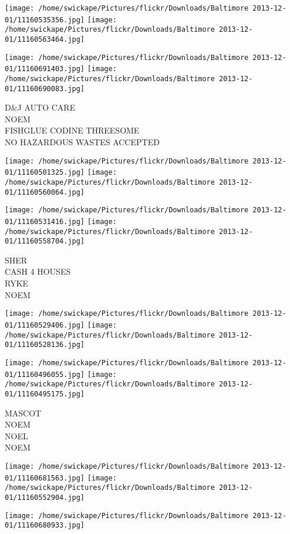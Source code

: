 \documentclass[10pt,letterpaper]{article}
\begin{document}
\texttt{[image: /home/swickape/Pictures/flickr/Downloads/Baltimore 2013-12-01/11160535356.jpg]}
\texttt{[image: /home/swickape/Pictures/flickr/Downloads/Baltimore 2013-12-01/11160563464.jpg]}

\texttt{[image: /home/swickape/Pictures/flickr/Downloads/Baltimore 2013-12-01/11160691403.jpg]}
\texttt{[image: /home/swickape/Pictures/flickr/Downloads/Baltimore 2013-12-01/11160690083.jpg]}

D\&J AUTO CARE\\
NOEM\\
FISHGLUE CODINE THREESOME\\
NO HAZARDOUS WASTES ACCEPTED
\pagebreak

\texttt{[image: /home/swickape/Pictures/flickr/Downloads/Baltimore 2013-12-01/11160501325.jpg]}
\texttt{[image: /home/swickape/Pictures/flickr/Downloads/Baltimore 2013-12-01/11160560064.jpg]}

\texttt{[image: /home/swickape/Pictures/flickr/Downloads/Baltimore 2013-12-01/11160531416.jpg]}
\texttt{[image: /home/swickape/Pictures/flickr/Downloads/Baltimore 2013-12-01/11160558704.jpg]}

SHER\\
CASH 4 HOUSES\\
RYKE\\
NOEM
\pagebreak

\texttt{[image: /home/swickape/Pictures/flickr/Downloads/Baltimore 2013-12-01/11160529406.jpg]}
\texttt{[image: /home/swickape/Pictures/flickr/Downloads/Baltimore 2013-12-01/11160528136.jpg]}

\texttt{[image: /home/swickape/Pictures/flickr/Downloads/Baltimore 2013-12-01/11160496055.jpg]}
\texttt{[image: /home/swickape/Pictures/flickr/Downloads/Baltimore 2013-12-01/11160495175.jpg]}

MASCOT\\
NOEM\\
NOEL\\
NOEM
\pagebreak

\texttt{[image: /home/swickape/Pictures/flickr/Downloads/Baltimore 2013-12-01/11160681563.jpg]}
\texttt{[image: /home/swickape/Pictures/flickr/Downloads/Baltimore 2013-12-01/11160552904.jpg]}

\texttt{[image: /home/swickape/Pictures/flickr/Downloads/Baltimore 2013-12-01/11160680933.jpg]}
\end{document}
